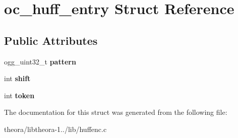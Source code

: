 \hypertarget{structoc__huff__entry}{\section{oc\+\_\+huff\+\_\+entry Struct Reference}
\label{structoc__huff__entry}
}
\subsection*{Public Attributes}
\begin{DoxyCompactItemize}
\item 
\hypertarget{structoc__huff__entry_a7da0aab73c0e0991af71ba2e492367a5}{ogg\+\_\+uint32\+\_\+t {\bfseries pattern}}\label{structoc__huff__entry_a7da0aab73c0e0991af71ba2e492367a5}

\item 
\hypertarget{structoc__huff__entry_a027c3a0d7402499c8a497a083af2e360}{int {\bfseries shift}}\label{structoc__huff__entry_a027c3a0d7402499c8a497a083af2e360}

\item 
\hypertarget{structoc__huff__entry_ab5eb853c4135d9864ddeae3455cd27cd}{int {\bfseries token}}\label{structoc__huff__entry_ab5eb853c4135d9864ddeae3455cd27cd}

\end{DoxyCompactItemize}


The documentation for this struct was generated from the following file\+:\begin{DoxyCompactItemize}
\item 
theora/libtheora-\/1../lib/huffenc.\+c\end{DoxyCompactItemize}
